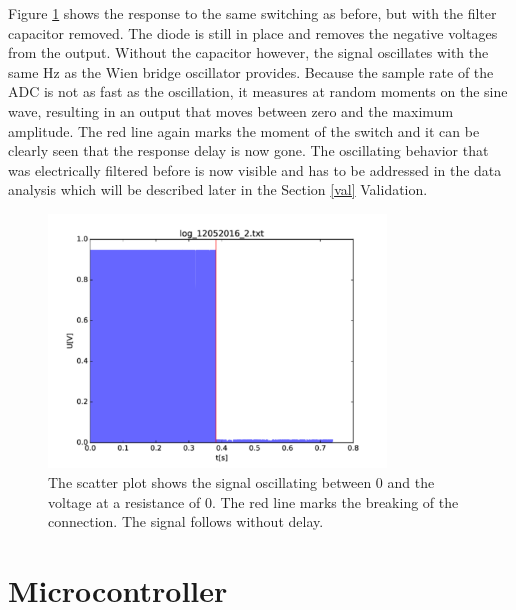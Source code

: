 Figure \ref{fig:swnocap} shows the response to the same switching as before, but with the filter capacitor removed. The diode is still in place and removes the negative voltages from the output. Without the capacitor however, the signal oscillates with the same \unit[1666]{Hz} as the Wien bridge oscillator provides. Because the sample rate of the ADC is not as fast as the oscillation, it measures at random moments on the sine wave, resulting in an output that moves between zero and the maximum amplitude. The red line again marks the moment of the switch and it can be clearly seen that the response delay is now gone. The oscillating behavior that was electrically filtered before is now visible and has to be addressed in the data analysis which will be described later in the Section \ref{val} Validation.

\begin{figure}
	\begin{center}
		\includegraphics[width=0.8\textwidth]{images/switch_nocap.pdf} 
		\caption{The scatter plot shows the signal oscillating between 0 and the voltage at a resistance of 0. The red line marks the breaking of the connection. The signal follows without delay.}
		\label{fig:swnocap}
	\end{center}
\end{figure}

\section{Microcontroller} \label{uc}


